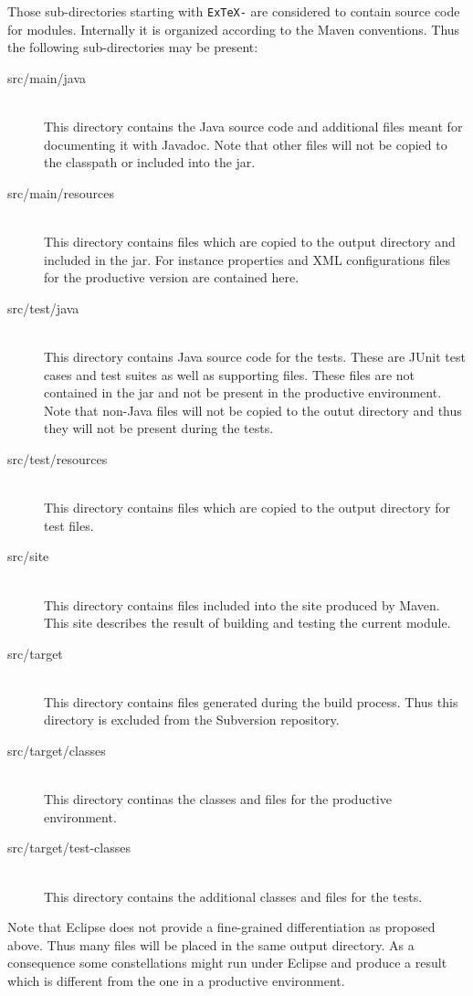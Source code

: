 Those sub-directories starting with \texttt{ExTeX-} are considered to
contain source code for modules. Internally it is organized according
to the Maven conventions. Thus the following sub-directories may be
present:

\begin{description}
\item[src/main/java] \ \\
  This directory contains the Java source code and additional files
  meant for documenting it with Javadoc. Note that other files will
  not be copied to the classpath or included into the jar.
\item[src/main/resources] \ \\
  This directory contains files which are copied to the output
  directory and included in the jar. For instance properties and XML
  configurations files for the productive version are contained here.
\item[src/test/java] \ \\
  This directory contains Java source code for the tests. These are
  JUnit test cases and test suites as well as supporting files. These
  files are not contained in the jar and not be present in the
  productive environment. Note that non-Java files will not be copied
  to the outut directory and thus they will not be present during the
  tests.
\item[src/test/resources] \ \\
  This directory contains files which are copied to the output
  directory for test files.
\item[src/site] \ \\
  This directory contains files included into the site produced by
  Maven. This site describes the result of building and testing the
  current module.
\item[src/target] \ \\
  This directory contains files generated during the build process.
  Thus this directory is excluded from the Subversion repository.
\item[src/target/classes] \ \\
  This directory continas the classes and files for the productive
  environment.
\item[src/target/test-classes] \ \\
  This directory contains the additional classes and files for the
  tests.
\end{description}

Note that Eclipse does not provide a fine-grained differentiation as
proposed above. Thus many files will be placed in the same output
directory. As a consequence some constellations might run under
Eclipse and produce a result which is different from the one in a
productive environment.


